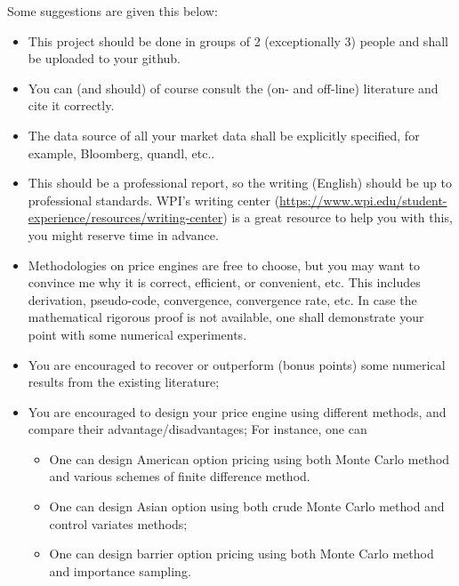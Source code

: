 \documentclass{article}
\begin{document}
Some suggestions are given this below:
\begin{itemize}
\item 
This project should be done in groups of 2 (exceptionally 3) people and shall be uploaded to your github.

\item You can (and should) of course consult the (on- and off-line) literature and cite it correctly.

\item The data source of all your market data shall be explicitly specified, for example, 
Bloomberg,  quandl, etc..

\item This should be a professional report, so the writing (English) should be up to professional standards. WPI's writing center (\url{https://www.wpi.edu/student-experience/resources/writing-center}) is a great resource to help you with this, you might reserve time in advance. 

 \item Methodologies on price engines are free to choose, 
 but you may want to convince me why it is correct, efficient, or convenient, etc. 
 This includes derivation, pseudo-code, convergence, 
 convergence rate, etc. 
 In case the mathematical rigorous proof is not available, 
 one shall demonstrate your point with some numerical experiments.
 
 \item You are encouraged to recover or outperform (bonus points) some numerical results from the existing literature;
 
 \item You are encouraged to design your price engine using different methods, and compare their advantage/disadvantages; For instance, one can 
\begin{itemize}
 \item One can design American option pricing using both 
 Monte Carlo method and
various schemes of finite difference method.
\item One can design Asian option using both 
crude Monte Carlo method and control variates methods;
\item One can design barrier option pricing using both Monte Carlo method and  importance sampling.
 
 \end{itemize} 
 
\end{itemize}
\end{document}
